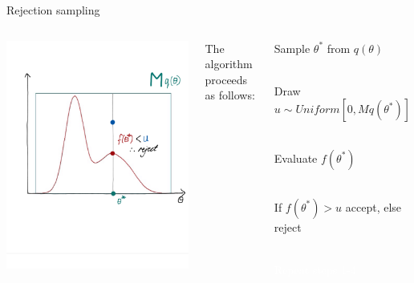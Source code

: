 \documentclass[compress]{beamer}
\begin{document}
\begin{frame}[label=sec-5-7]{Rejection sampling}
    \begin{columns}[c] 
    \includegraphics[width=1\linewidth]{RS6.png}

    The algorithm proceeds as follows:\\
    \begin{enumerate}
        \item Sample $\theta^*$ from $q(\theta)$ \\~\\
        \item Draw $u \sim Uniform[0, Mq(\theta^*)]$ \\~\\
        \item Evaluate $f(\theta^*)$ \\~\\
        \item If $f(\theta^*) > u$ accept, else reject \\~\\
        \textcolor{white}{
            \item[\color{white}] Repeat steps 1-4
        }
    \end{enumerate}
\end{columns}
\end{frame}
\end{document}
